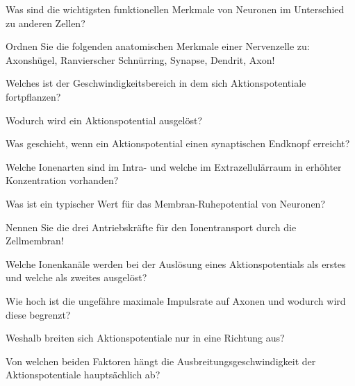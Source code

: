 \documentclass[10pt, a4paper]{exam}
\begin{document}
\begin{questions}
\begin{solution}
  \end{solution}
  \question Was sind die wichtigsten funktionellen Merkmale von Neuronen im Unterschied zu anderen Zellen?
  \begin{solution}
  \end{solution}
  \question Ordnen Sie die folgenden anatomischen Merkmale einer Nervenzelle zu: Axonshügel, Ranvierscher Schnürring, Synapse, Dendrit, Axon!
  \begin{solution}
  \end{solution}
  \question Welches ist der Geschwindigkeitsbereich in dem sich Aktionspotentiale fortpflanzen?
  \begin{solution}
  \end{solution}
  \question Wodurch wird ein Aktionspotential ausgelöst?
  \begin{solution}
  \end{solution}
  \question Was geschieht, wenn ein Aktionspotential einen synaptischen Endknopf erreicht?
  \begin{solution}
  \end{solution}
  \question Welche Ionenarten sind im Intra- und welche im Extrazellulärraum in erhöhter Konzentration vorhanden?
  \begin{solution}
  \end{solution}
  \question Was ist ein typischer Wert für das Membran-Ruhepotential von Neuronen?
  \begin{solution}
  \end{solution}
  \question Nennen Sie die drei Antriebskräfte für den Ionentransport durch die Zellmembran!
  \begin{solution}
  \end{solution}
  \question Welche Ionenkanäle werden bei der Auslösung eines Aktionspotentials als erstes und welche als zweites ausgelöst?
  \begin{solution}
  \end{solution}
  \question Wie hoch ist die ungefähre maximale Impulsrate auf Axonen und wodurch wird diese begrenzt?
  \begin{solution}
  \end{solution}
  \question Weshalb breiten sich Aktionspotentiale nur in eine Richtung aus?
  \begin{solution}
  \end{solution}
  \question Von welchen beiden Faktoren hängt die Ausbreitungsgeschwindigkeit der Aktionspotentiale hauptsächlich ab?
  \begin{solution}
  \end{solution}

\end{questions}
\end{document}
